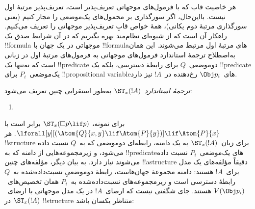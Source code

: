 \documentclass[../../../include/open-logic-section]{subfiles}
\begin{document}


هر خاصیت قاب که با فرمول‌های موجهاتی تعریف‌پذیر است، تعریف‌پذیر مرتبهٔ
اول نیست. بااین‌حال، اگر سورگذاری بر محمول‌های یک‌موضعی را مجاز کنیم
(یعنی سورگذاری مرتبهٔ دوم یکانی)، همهٔ خواص قابِ تعریف‌پذیر موجهاتی را
تعریف می‌کنیم. راهکار آن است که از شیوه‌ای نظام‌مند بهره بگیریم که در
آن شرایط صدق یک !!{formula} موجهاتی در یک جهان با !!{formula}های مرتبهٔ
اول مرتبط می‌شوند. این همان به‌اصطلاح ترجمهٔ استاندارد فرمول‌های
موجهاتی به فرمول‌های مرتبهٔ اول در زبانی است که نه‌تنها یک
!!{predicate} دوموضعی~$Q$ برای رابطهٔ دسترسی، بلکه یک !!{predicate}
یک‌موضعی~$P_i$ برای !!{propositional variable}های~$\Obj p_i$ رخ‌دهنده
در~$!A$ نیز دارد.

\begin{defn}
  \emph{ترجمهٔ استاندارد}~$\ST_x(!A)$ به‌طور استقرایی چنین تعریف می‌شود:
  \begin{enumerate}
  \item {}
  \end{enumerate}
\end{defn}

برای نمونه، $\ST_x(\Box p \lif p)$ برابر است با
$\lforall[y][(\Atom{Q}{x,y} \lif \Atom{P}{y})] \lif \Atom{P}{x}$.
هر !!{structure} برای زبان~$\ST_x(!A)$ به یک دامنه، رابطه‌ای دوموضعی
که به~$Q$ نسبت داده می‌شود، و زیرمجموعه‌هایی از دامنه که به
!!{predicate}های یک‌موضعی~$P_i$ نسبت داده می‌شوند نیاز دارد. به بیان
دیگر، مؤلفه‌های چنین !!a{structure} دقیقاً مؤلفه‌های یک مدل برای~$!A$
هستند: دامنه مجموعهٔ جهان‌هاست، رابطهٔ دوموضعیِ نسبت‌داده‌شده به~$Q$
رابطهٔ دسترسی است و زیرمجموعه‌های نسبت‌داده‌شده به~$P_i$ همان
تخصیص‌های~$V(\Obj p_i)$ هستند. جای شگفتی نیست که ارضای~$!A$ در یک مدل
موجهاتی با ارضای~$\ST_x(!A)$ در !!{structure} متناظر یکسان باشد:
\end{document}
